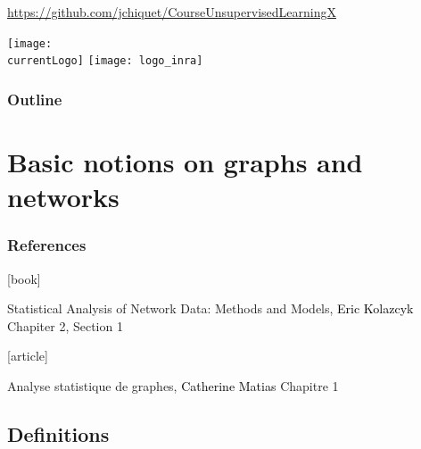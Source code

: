 \documentclass{beamer}\usepackage[]{graphicx}\usepackage[]{color}
\title{\currentCourse}
\subtitle{\huge\currentChapter\normalsize}
\institute{\currentInstitute}
\date{\currentDate}
\def\currentLogo{../common_figs/logo_X}
\newcommand{\dotitlepage}{%
  \begin{frame}
    \titlepage
    \vfill
    \begin{center}
        \scriptsize\url{https://github.com/jchiquet/CourseUnsupervisedLearningX}
    \end{center}
    \vfill
    \texttt{[image: \\currentLogo]}\hfill
    \texttt{[image: logo\_inra]}
  \end{frame}
}
\begin{document}
\dotitlepage

\begin{frame}
  \frametitle{Outline}
  \tableofcontents
\end{frame}

\section{Basic notions on graphs and networks}

\begin{frame} 
  \frametitle{References}

    \begin{thebibliography}{99}
      [book]

     Statistical Analysis of Network Data: Methods and Models, 
    \newblock \textcolor{black}{Eric Kolazcyk} 
    \newblock \alert{Chapiter 2, Section 1}

      [article]

     Analyse statistique de graphes, 
    \newblock \textcolor{black}{Catherine Matias}
    \newblock \alert{Chapitre 1}    

    \end{thebibliography}

\end{frame}

\subsection{Definitions}
\end{document}
